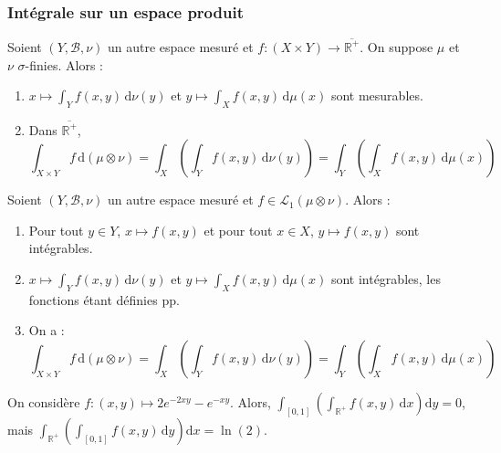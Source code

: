   \subsubsection{Intégrale sur un espace produit}


  \begin{theorem}
    Soient $(Y, \mathcal{B}, \nu)$ un autre espace mesuré et $f : (X \times Y) \rightarrow \overline{\mathbb{R}^+}$. On suppose $\mu$ et $\nu$ $\sigma$-finies. Alors :
    \begin{enumerate}[label={\bfseries(\roman*)}]
      \item $x \mapsto \int_Y f(x,y) \, \mathrm{d}\nu(y)$ et $y \mapsto \int_X f(x,y) \, \mathrm{d}\mu(x)$ sont mesurables.
      \item Dans $\overline{\mathbb{R}^+}$,
      \[ \int_{X \times Y} f \, \mathrm{d}(\mu \otimes \nu) = \int_X \left( \int_Y f(x,y) \, \mathrm{d}\nu(y) \right) = \int_Y \left( \int_X f(x,y) \, \mathrm{d}\mu(x) \right) \]
    \end{enumerate}
  \end{theorem}

  \begin{theorem}
    Soient $(Y, \mathcal{B}, \nu)$ un autre espace mesuré et $f \in \mathcal{L}_1 (\mu \otimes \nu)$. Alors :
    \begin{enumerate}[label={\bfseries(\roman*)}]
      \item Pour tout $y \in Y$, $x \mapsto f(x,y)$ et pour tout $x \in X$, $y \mapsto f(x,y)$ sont intégrables.
      \item $x \mapsto \int_Y f(x,y) \, \mathrm{d}\nu(y)$ et $y \mapsto \int_X f(x,y) \, \mathrm{d}\mu(x)$ sont intégrables, les fonctions étant définies pp.
      \item On a :
      \[ \int_{X \times Y} f \, \mathrm{d}(\mu \otimes \nu) = \int_X \left( \int_Y f(x,y) \, \mathrm{d}\nu(y) \right) = \int_Y \left( \int_X f(x,y) \, \mathrm{d}\mu(x) \right) \]
    \end{enumerate}
  \end{theorem}

  \begin{cexample}
    On considère $f : (x,y) \mapsto 2e^{-2xy} - e^{-xy}$. Alors, $\int_{[0,1]} \left( \int_{\mathbb{R}^+} f(x,y) \, \mathrm{d}x \right) \mathrm{d}y = 0$, mais $\int_{\mathbb{R}^+} \left( \int_{[0,1]} f(x,y) \, \mathrm{d}y \right) \mathrm{d}x = \ln(2)$.
  \end{cexample}


